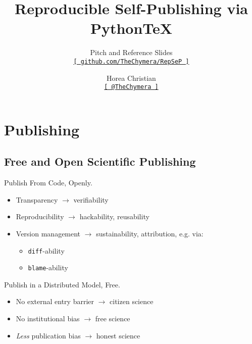 

\title[Reproducible Self-Publishing via Python\TeX\ --- Pitch and Reference Slides]{Reproducible Self-Publishing via Python\TeX}
\subtitle{Pitch and Reference Slides\\\href{https://github.com/TheChymera/RepSeP}{\small\texttt{[ github.com/TheChymera/RepSeP ]}}}
\author[Horea Christian]{Horea Christian\\\href{https://twitter.com/TheChymera}{\small\texttt{[ @TheChymera ]}}}

	\begin{frame}
		\titlepage
	\end{frame}
	\section{Publishing}
		\subsection{Free and Open Scientific Publishing}
			\begin{frame}{Publish From Code, Openly.}
				\begin{itemize}
					\item Transparency $\longrightarrow$ verifiability
					\item Reproducibility $\longrightarrow$ hackability, reusability
					\item Version management $\longrightarrow$ sustainability, attribution, e.g. via:
					\begin{itemize}
						\item \colorbox{tlg}{\texttt{diff}}-ability
						\item \colorbox{tlg}{\texttt{blame}}-ability
					\end{itemize}
				\end{itemize}
			\end{frame}
			\begin{frame}{Publish in a Distributed Model, Free.}
				\begin{itemize}
					\item No external entry barrier $\longrightarrow$ citizen science
					\item No institutional bias $\longrightarrow$ free science
					\item \textit{Less} publication bias $\longrightarrow$ honest science
				\end{itemize}
			\end{frame}
